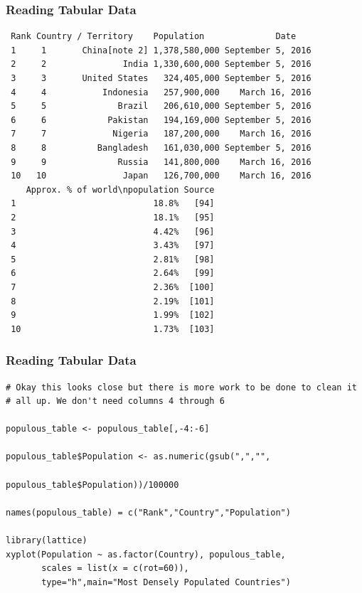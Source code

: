 \documentclass{beamer}
\begin{document}
%
\begin{frame}[fragile]
\frametitle{Reading Tabular Data}
\scriptsize
\begin{verbatim}
 Rank Country / Territory    Population              Date
 1     1       China[note 2] 1,378,580,000 September 5, 2016
 2     2               India 1,330,600,000 September 5, 2016
 3     3       United States   324,405,000 September 5, 2016
 4     4           Indonesia   257,900,000    March 16, 2016
 5     5              Brazil   206,610,000 September 5, 2016
 6     6            Pakistan   194,169,000 September 5, 2016
 7     7             Nigeria   187,200,000    March 16, 2016
 8     8          Bangladesh   161,030,000 September 5, 2016
 9     9              Russia   141,800,000    March 16, 2016
 10   10               Japan   126,700,000    March 16, 2016
    Approx. % of world\npopulation Source
 1                           18.8%   [94]
 2                           18.1%   [95]
 3                           4.42%   [96]
 4                           3.43%   [97]
 5                           2.81%   [98]
 6                           2.64%   [99]
 7                           2.36%  [100]
 8                           2.19%  [101]
 9                           1.99%  [102]
 10                          1.73%  [103]

\end{verbatim}

\end{frame}

%
\begin{frame}[fragile]
\frametitle{Reading Tabular Data}
\footnotesize
\begin{verbatim}
# Okay this looks close but there is more work to be done to clean it 
# all up. We don't need columns 4 through 6 

populous_table <- populous_table[,-4:-6]

populous_table$Population <- as.numeric(gsub(",","",
                                       populous_table$Population))/100000

names(populous_table) = c("Rank","Country","Population")

library(lattice)
xyplot(Population ~ as.factor(Country), populous_table,
       scales = list(x = c(rot=60)),
       type="h",main="Most Densely Populated Countries")
\end{verbatim}

\end{frame}
\end{document}
